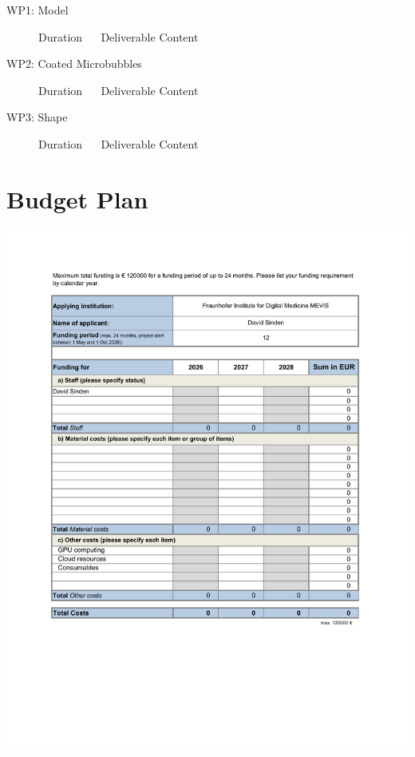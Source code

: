 \vspace{\baselineskip}


\begin{description}
\item[WP1: Model] \hfill Duration $\quad$ Deliverable 
\newline{} Content

\item[WP2: Coated Microbubbles] \hfill Duration $\quad$ Deliverable 
\newline{} Content

\item[WP3: Shape] \hfill Duration $\quad$ Deliverable 
\newline{} Content
\end{description}

\vspace{\baselineskip}


\newpage
\section{Budget Plan}

\includegraphics[scale=1, trim=2.45cm 6cm 2.6cm 1.9cm, clip]{budget.pdf}




